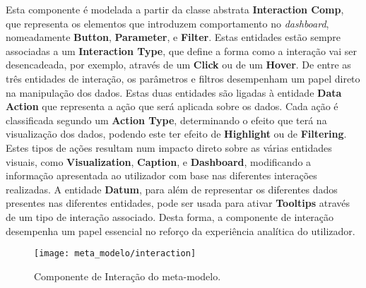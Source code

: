 Esta componente é modelada a partir da classe abstrata \textbf{Interaction Comp}, que representa os elementos que introduzem comportamento no \textit{dashboard}, nomeadamente \textbf{Button}, \textbf{Parameter}, e \textbf{Filter}. Estas entidades estão sempre associadas a um \textbf{Interaction Type}, que define a forma como a interação vai ser desencadeada, por exemplo, através de um \textbf{Click} ou de um \textbf{Hover}. De entre as três entidades de interação, os parâmetros e filtros desempenham um papel direto na manipulação dos dados. Estas duas entidades são ligadas à entidade \textbf{Data Action} que representa a ação que será aplicada sobre os dados. Cada ação é classificada segundo um \textbf{Action Type}, determinando o efeito que terá na visualização dos dados, podendo este ter efeito de \textbf{Highlight} ou de \textbf{Filtering}. Estes tipos de ações resultam num impacto direto sobre as várias entidades visuais, como \textbf{Visualization}, \textbf{Caption}, e \textbf{Dashboard}, modificando a informação apresentada ao utilizador com base nas diferentes interações realizadas. A entidade \textbf{Datum}, para além de representar os diferentes dados presentes nas diferentes entidades, pode ser usada para ativar \textbf{Tooltips} através de um tipo de interação associado. Desta forma, a componente de interação desempenha um papel essencial no reforço da experiência analítica do utilizador. 

\begin{figure}[htbp]
  \texttt{[image: meta\_modelo/interaction]}
  \centering
  \caption{Componente de Interação do meta-modelo.}
  \label{fig:interaction}
\end{figure}

